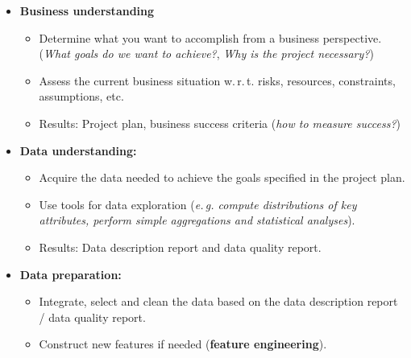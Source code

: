\begin{frame}
	\begin{itemize}
		\item \textbf{Business understanding}
		\begin{itemize}
			\item Determine what you want to accomplish from a business perspective. \\
				(\textit{What goals do we want to achieve?}, \textit{Why is the project necessary?})
			\item Assess the current business situation w.\,r.\,t. risks, resources, constraints, assumptions, etc.
			\item Results: Project plan, business success criteria (\textit{how to measure success?})
		\end{itemize} 
		\item \textbf{Data understanding:}
		\begin{itemize}
			\item Acquire the data needed to achieve the goals specified in the project plan.
			\item Use tools for data exploration (\textit{e.\,g. compute distributions of key attributes, perform simple aggregations and statistical analyses}).
			\item Results: Data description report and data quality report.
		\end{itemize}
		\item \textbf{Data preparation:}
		\begin{itemize}
			\item Integrate, select and clean the data based on the data description report / data quality report.
			\item Construct new features if needed (\textbf{feature engineering}).
		\end{itemize}
	\end{itemize}
\end{frame}


